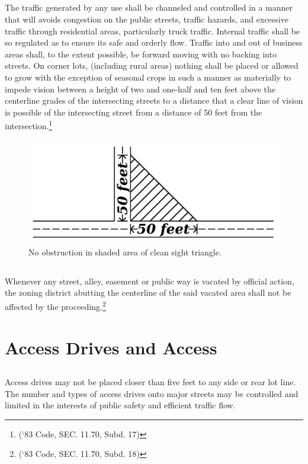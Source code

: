 \subsection{}
The traffic generated by any use shall be channeled and controlled in a manner that will avoids congestion on the public streets, traffic hazards, and excessive traffic through residential areas, particularly truck traffic. Internal traffic shall be so regulated as to ensure its safe and orderly flow. Traffic into and out of business areas shall, to the extent possible, be forward moving with no backing into streets. On corner lots, (including rural areas) nothing shall be placed or allowed to grow with the exception of seasonal crops in such a manner as materially to impede vision between a height of two and one-half and ten feet above the centerline grades of the intersecting streets to a distance that a clear line of vision is possible of the intersecting street from a distance of 50 feet from the intersection.\footnote{(‘83 Code, SEC. 11.70, Subd. 17)}
\begin{figure}[h]
    \centering
    \includegraphics[width=\textwidth]{./images/citycode_fig1.jpg}
    \caption{No obstruction in shaded area of clean sight triangle.}
\end{figure}
\subsection{}
Whenever any street, alley, easement or public way is vacated by official action, the zoning district abutting the centerline of the said vacated area shall not be affected by the proceeding.\footnote{(‘83 Code, SEC. 11.70, Subd. 18)}
\section{Access Drives and Access}
\subsection{}
Access drives may not be placed closer than five feet to any side or rear lot line.  The number and types of access drives onto major streets may be controlled and limited in the interests of public safety and efficient traffic flow.
